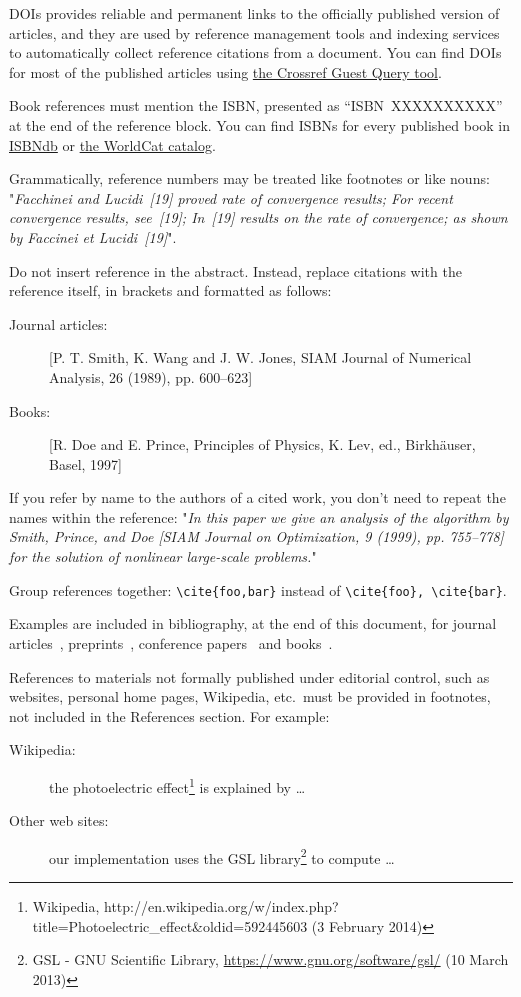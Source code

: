 \documentclass{ipol}
\begin{document}
DOIs provides reliable and permanent links to the officially published
version of articles, and they are used by reference management tools
and indexing services to automatically collect reference citations
from a document. You can find DOIs for most of the published articles
using \href{http://www.crossref.org/guestquery/}{the Crossref Guest
  Query tool}.

Book references must mention the ISBN, presented as
``ISBN~XXXXXXXXXX'' at the end of the reference block. You can find
ISBNs for every published book in \href{http://isbndb.com/}{ISBNdb} or 
\href{http://www.worldcat.org/advancedsearch}{the WorldCat catalog}.

Grammatically, reference numbers may be treated like footnotes or
like nouns:
"\emph{Facchinei and Lucidi~[19] proved rate of convergence
  results; For recent convergence results, see~[19]; In~[19] results
  on the rate of convergence; as shown by Faccinei et Lucidi~[19]}".

Do not insert reference in the abstract. Instead, replace citations
with the reference itself, in brackets and formatted as follows:
\begin{description}
\item[Journal articles:]
  [P. T. Smith, K. Wang and J. W. Jones, SIAM Journal of Numerical
  Analysis, 26 (1989), pp. 600–623]
\item[Books:]
  [R. Doe and E. Prince, Principles of Physics, K. Lev, ed.,
  Birkhäuser, Basel, 1997]
\end{description}
If you refer by name to the authors of a cited work, you don’t need
to repeat the names within the reference: "\emph{In this paper we give
  an analysis of the algorithm by Smith, Prince, and Doe [SIAM Journal
    on Optimization, 9 (1999), pp. 755–778] for the solution of
  nonlinear large-scale problems.}"

Group references together: \verb|\cite{foo,bar}| instead of
\verb|\cite{foo}, \cite{bar}|.

Examples are included in bibliography, at the end of this document, for
journal articles~\cite{article}, preprints~\cite{preprint}, conference
papers~\cite{conference} and books~\cite{book}.

References to materials not formally published under editorial
control, such as websites, personal home pages, Wikipedia, etc.\ must
be provided in footnotes, not included in the References section. For example:

\begin{description}
\item[Wikipedia:]
  the photoelectric effect\footnote{Wikipedia,
    http://en.wikipedia.org/w/index.php?title=Photoelectric\_effect\&oldid=592445603 (3 February 2014)}
  is explained by \ldots
\item[Other web sites:]
  our implementation uses the GSL library\footnote{
GSL - GNU Scientific Library, \url{https://www.gnu.org/software/gsl/}
(10 March 2013)} to compute \ldots
\end{description}
\end{document}
